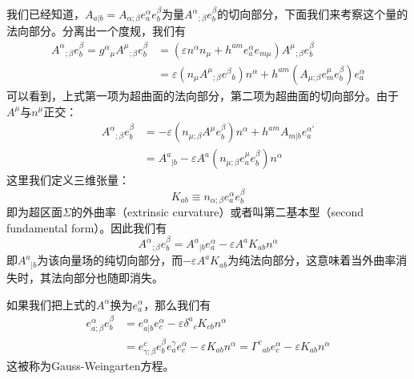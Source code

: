 \documentclass[hyperref, UTF8, a4paper]{ctexart}
\begin{document}
我们已经知道，$A_{a|b} =A_{\alpha ;\beta } e_{a}^{\alpha } e_{b}^{\beta }$为量$A^{\alpha }{}_{;\beta } e_{b}^{\beta }$的切向部分，下面我们来考察这个量的法向部分。分离出一个度规，我们有
\begin{equation*}
	\begin{aligned}
		A^{\alpha }{}_{;\beta } e_{b}^{\beta } =g^{\alpha }{}_{\mu } A^{\mu }{}_{;\beta } e_{b}^{\beta } & =(\varepsilon n^{\alpha } n_{\mu } +h^{am} e_{a}^{\alpha } e_{m\mu } )A^{\mu }{}_{;\beta } e_{b}^{\beta }\\
		& =\varepsilon (n_{\mu } A^{\mu }{}_{;\beta } e^{\beta }{}_{b} )n^{\alpha } +h^{am} (A_{\mu ;\beta } e_{m}^{\mu } e_{b}^{\beta } )e_{a}^{\alpha }
	\end{aligned}
\end{equation*}
可以看到，上式第一项为超曲面的法向部分，第二项为超曲面的切向部分。由于$A^{\mu }$与$n^{\mu }$正交：
\begin{equation*}
	\begin{aligned}
		A^{\alpha }{}_{;\beta } e_{b}^{\beta } & =-\varepsilon (n_{\mu ;\beta } A^{\mu } e_{b}^{\beta } )n^{\alpha } +h^{am} A_{m|b} e_{a}^{\alpha '}\\
		& =A^{a}{}_{|b} -\varepsilon A^{a} (n_{\mu ;\beta } e_{a}^{\mu } e_{b}^{\beta } )n^{\alpha }
	\end{aligned}
\end{equation*}
这里我们定义三维张量：
\begin{equation*}
	K_{ab} \equiv n_{\alpha ;\beta } e_{a}^{\alpha } e_{b}^{\beta }
\end{equation*}
即为超区面$\Sigma $的外曲率（extrinsic curvature）或者叫第二基本型（second fundamental form）。因此我们有
\begin{equation*}
	A^{\alpha }{}_{;\beta } e_{b}^{\beta } =A^{a}{}_{|b} e_{a}^{\alpha } -\varepsilon A^{a} K_{ab} n^{\alpha }
\end{equation*}
即$A^{a}{}_{|b}$为该向量场的纯切向部分，而$-\varepsilon A^{a} K_{ab}$为纯法向部分，这意味着当外曲率消失时，其法向部分也随即消失。

如果我们把上式的$A^{\alpha }$换为$e_{a}^{\alpha }$，那么我们有
\begin{equation*}
	\begin{aligned}
		e_{a;\beta }^{\alpha } e_{b}^{\beta } & =e_{a|b}^{\alpha } e_{c}^{\alpha } -\varepsilon \delta ^{a}{}_{c} K_{cb} n^{\alpha }\\
		& =e_{\gamma ;\beta }^{c} e_{b}^{\beta } e_{a}^{\gamma } e_{c}^{\alpha } -\varepsilon K_{ab} n^{\alpha } =\Gamma ^{c}{}_{ab} e_{c}^{\alpha } -\varepsilon K_{ab} n^{\alpha }
	\end{aligned}
\end{equation*}
这被称为Gauss-Weingarten方程。
\end{document}
